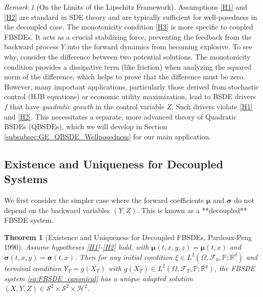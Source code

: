 \documentclass[11pt,letterpaper,oneside]{article}
\theoremstyle{plain}
\newtheorem{theorem}{Theorem}[section]
\theoremstyle{definition}
\theoremstyle{remark}
\newtheorem{remark}{Remark}[section]
\begin{document}
\begin{remark}[On the Limits of the Lipschitz Framework]
Assumptions \ref{H1} and \ref{H2} are standard in SDE theory and are typically sufficient for well-posedness in the decoupled case. The monotonicity condition \ref{H3} is more specific to coupled FBSDEs. It acts as a crucial stabilizing force, preventing the feedback from the backward process \(Y\) into the forward dynamics from becoming explosive. To see why, consider the difference between two potential solutions. The monotonicity condition provides a dissipative term (like friction) when analyzing the squared norm of the difference, which helps to prove that the difference must be zero. However, many important applications, particularly those derived from stochastic control (HJB equations) or economic utility maximization, lead to BSDE drivers \(f\) that have \emph{quadratic growth} in the control variable \(Z\). Such drivers violate \ref{H1} and \ref{H2}. This necessitates a separate, more advanced theory of Quadratic BSDEs (QBSDEs), which we will develop in Section \ref{subsubsec:GE_QBSDE_Wellposedness} for our main application.
\end{remark}

\subsection{Existence and Uniqueness for Decoupled Systems}
\label{sec:decoupled}

We first consider the simpler case where the forward coefficients \(\bm\mu\) and \(\bm\sigma\) do not depend on the backward variables \((Y,Z)\). This is known as a **decoupled** FBSDE system.

\begin{theorem}[Existence and Uniqueness for Decoupled FBSDEs, Pardoux-Peng 1990]
\label{thm:PP_decoupled}
Assume hypotheses \ref{H1}-\ref{H2} hold, with \(\bm\mu(t,x,y,z) = \bm\mu(t,x)\) and \(\bm\sigma(t,x,y) = \bm\sigma(t,x)\). Then for any initial condition \(\xi \in L^2(\Omega, \mathcal{F}_0, \mathbb{P}; \mathbb{R}^d)\) and terminal condition \(Y_T = g(X_T)\) with \(g(X_T) \in L^2(\Omega, \mathcal{F}_T, \mathbb{P}; \mathbb{R}^q)\), the FBSDE system \eqref{eq:FBSDE_canonical} has a unique adapted solution \((X,Y,Z)\in\mathcal S^2\times\mathcal S^2\times\mathcal H^2\).
\end{theorem}
\end{document}
